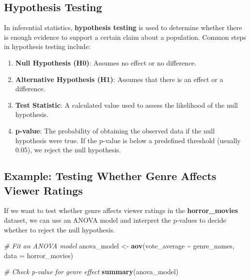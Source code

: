 \documentclass[
]{book}
\newenvironment{Shaded}{\begin{snugshade}}{\end{snugshade}}
\newcommand{\AttributeTok}[1]{\textcolor[rgb]{0.13,0.29,0.53}{#1}}
\newcommand{\CommentTok}[1]{\textcolor[rgb]{0.56,0.35,0.01}{\textit{#1}}}
\newcommand{\FunctionTok}[1]{\textcolor[rgb]{0.13,0.29,0.53}{\textbf{#1}}}
\newcommand{\NormalTok}[1]{#1}
\newcommand{\OtherTok}[1]{\textcolor[rgb]{0.56,0.35,0.01}{#1}}
\newcommand{\SpecialCharTok}[1]{\textcolor[rgb]{0.81,0.36,0.00}{\textbf{#1}}}
\providecommand{\tightlist}{%
  \setlength{\itemsep}{0pt}\setlength{\parskip}{0pt}}
\begin{document}
\subsection*{Hypothesis Testing}\label{hypothesis-testing}

In inferential statistics, \textbf{hypothesis testing} is used to determine whether there is enough evidence to support a certain claim about a population. Common steps in hypothesis testing include:

\begin{enumerate}
\def\labelenumi{\arabic{enumi}.}
\tightlist
\item
  \textbf{Null Hypothesis (H0)}: Assumes no effect or no difference.
\item
  \textbf{Alternative Hypothesis (H1)}: Assumes that there is an effect or a difference.
\item
  \textbf{Test Statistic}: A calculated value used to assess the likelihood of the null hypothesis.
\item
  \textbf{p-value}: The probability of obtaining the observed data if the null hypothesis were true. If the p-value is below a predefined threshold (usually 0.05), we reject the null hypothesis.
\end{enumerate}

\subsection*{Example: Testing Whether Genre Affects Viewer Ratings}\label{example-testing-whether-genre-affects-viewer-ratings}

If we want to test whether genre affects viewer ratings in the \textbf{horror\_movies} dataset, we can use an ANOVA model and interpret the p-values to decide whether to reject the null hypothesis.

\begin{Shaded}
\begin{Highlighting}[]
\CommentTok{\# Fit an ANOVA model}
\NormalTok{anova\_model }\OtherTok{\textless{}{-}} \FunctionTok{aov}\NormalTok{(vote\_average }\SpecialCharTok{\textasciitilde{}}\NormalTok{ genre\_names, }\AttributeTok{data =}\NormalTok{ horror\_movies)}

\CommentTok{\# Check p{-}value for genre effect}
\FunctionTok{summary}\NormalTok{(anova\_model)}
\end{Highlighting}
\end{Shaded}
\end{document}
